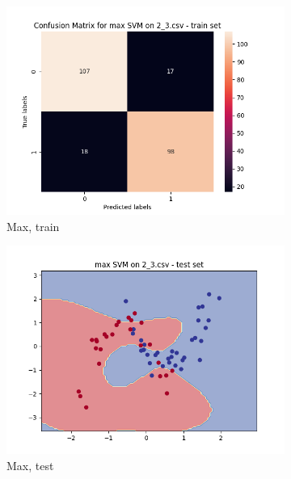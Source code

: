 \documentclass[12pt]{article}
\newcommand*{\subfigwidth}{0.24\textwidth}
\begin{document}
\begin{figure}[H]
\begin{subfigure}[t]{\subfigwidth}
        \includegraphics[width=\linewidth]{img/exp_2/svm/2_3/max/train_matrix.png}
        \caption{Max, train}
    \end{subfigure}
    \hfill
    \begin{subfigure}[t]{\subfigwidth}
        \includegraphics[width=\linewidth]{img/exp_2/svm/2_3/max/test_boundary.png}
        \caption{Max, test}
    \end{subfigure}
    \hfill
    \begin{subfigure}[t]{\subfigwidth}

\end{subfigure}
\end{figure}
\end{document}
